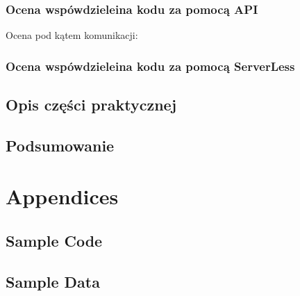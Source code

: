 \documentclass[runningheads,12pt]{llncs}
\begin{document}
\subsubsection{Ocena wspówdzieleina kodu za pomocą API}

Ocena pod kątem komunikacji: 

\subsubsection{Ocena wspówdzieleina kodu za pomocą ServerLess}

\subsection{Opis części praktycznej}



\subsection{Podsumowanie}

\nocite{*}

\listoftables

\listoffigures




\section{Appendices}

\subsection{Sample Code}
\subsection{Sample Data}
\end{document}
